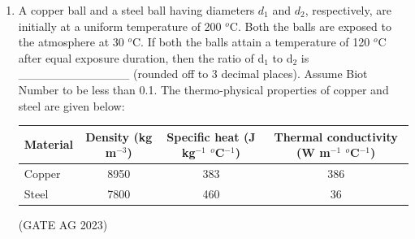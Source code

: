 \documentclass[journal,12pt,onecolumn]{IEEEtran}
\theoremstyle{remark}
\begin{document}
\begin{enumerate}
    \item A copper ball and a steel ball having diameters $d_{1}$ and $d_{2}$, respectively, are initially at a uniform temperature of 200 $^{o}$C. Both the balls are exposed to the atmosphere at 30 $^{o}$C. If both the balls attain a temperature of 120 $^{o}$C after equal exposure duration, then the ratio of d$_{1}$ to d$_{2}$ is \_\_\_\_\_\_\_\_\_\_\_\_\_ (rounded off to 3 decimal places).
    Assume Biot Number to be less than 0.1. The thermo-physical properties of copper and steel are given below:

    
    \begin{tabular}{|l|c|c|c|}
        \hline
        Material & Density (kg m$^{-3}$) & Specific heat (J kg$^{-1}$ $^{o}$C$^{-1}$) & Thermal conductivity (W m$^{-1}$ $^{o}$C$^{-1}$) \\
        \hline
        Copper & 8950 & 383 & 386 \\
        \hline
        Steel & 7800 & 460 & 36 \\
        \hline
    \end{tabular}
    \hfill{(GATE AG 2023)}

\end{enumerate}
\end{document}

